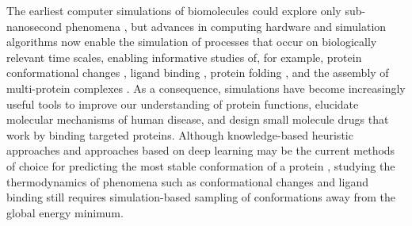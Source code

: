 \documentclass[9pt,review,pubversion]{livecoms}
\begin{document}
The earliest computer simulations of biomolecules could explore only sub-nanosecond phenomena \cite{mccammon_dynamics_1977,case_dynamics_1979,levitt_accurate_1988}, but advances in computing hardware \cite{stone_accelerating_2007,shaw_anton_2008} and simulation algorithms \cite{darden_particle_1993,wennberg_direct-space_2015} now enable the simulation of processes that occur on biologically relevant time scales, enabling informative studies of, for example, protein conformational changes \cite{grant_large_2010,anandakrishnan_speed_2015}, ligand binding \cite{gilson_calculation_2007,wang_identifying_2013,reif_net_2014}, protein folding \cite{lindorff-larsen_how_2011,shaw_atomic-level_2010}, and the assembly of multi-protein complexes \cite{saglam_proteinprotein_2019}.
As a consequence, simulations have become increasingly useful tools to improve our understanding of protein functions, elucidate molecular mechanisms of human disease, and design small molecule drugs that work by binding targeted proteins.
Although knowledge-based heuristic approaches \cite{rohl_protein_2004} and approaches based on deep learning \cite{jumper_highly_2021} may be the current methods of choice for predicting the most stable conformation of a protein \cite{kryshtafovych_critical_2021}, studying the thermodynamics of phenomena such as conformational changes and ligand binding still requires simulation-based sampling of conformations away from the global energy minimum.
\end{document}
